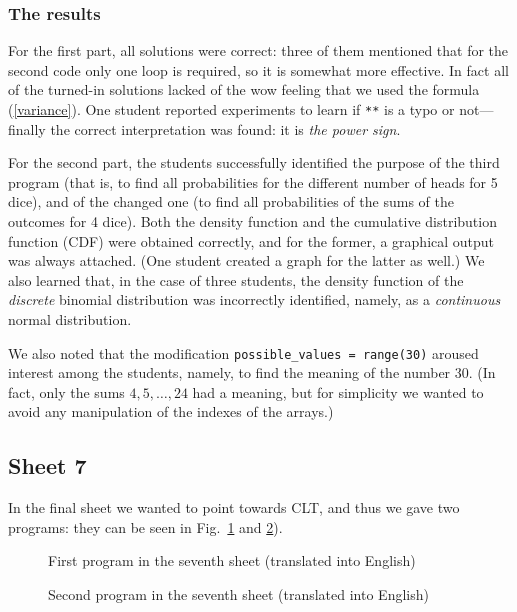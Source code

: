 \documentclass[]{interact}
\theoremstyle{plain}%
\theoremstyle{definition}
\theoremstyle{remark}
\begin{document}
\subsubsection*{The results}

For the first part, all solutions were correct: three of them mentioned that
for the second code only one loop is required, so it is somewhat more effective.
In fact all of the turned-in solutions lacked of the wow feeling that we used
the formula (\ref{variance}). One student reported
experiments to learn if \texttt{**} is a typo or not---finally the correct interpretation
was found: it is \textit{the power sign}.

For the second part, the students successfully identified the purpose of the third program
(that is, to find all probabilities for the different number of heads for 5 dice), and of the changed one
(to find all probabilities of the sums of the outcomes for 4 dice). Both the density
function and the cumulative distribution function (CDF) were obtained correctly, and for the former,
a graphical output was always attached. (One student created a graph for the latter as well.)
We also learned that, in the case of three students, the density function of the
\textit{discrete} binomial distribution
was incorrectly identified, namely, as a \textit{continuous} normal distribution.

We also noted that the modification \texttt{possible\_values = range(30)} aroused interest
among the students,
namely, to find the meaning of the number 30. (In fact, only the sums $4,5,\ldots,24$
had a meaning, but for simplicity we wanted to avoid any manipulation of the indexes of
the arrays.)

\subsection*{Sheet 7}

In the final sheet we wanted to point towards CLT, and thus we gave two programs:
they can be seen in Fig.~\ref{7a.py} and \ref{7b.py}).

\begin{figure}

\caption{First program in the seventh sheet (translated into English)}
\label{7a.py}
\end{figure}

\begin{figure}

\caption{Second program in the seventh sheet (translated into English)}
\label{7b.py}
\end{figure}
\end{document}
